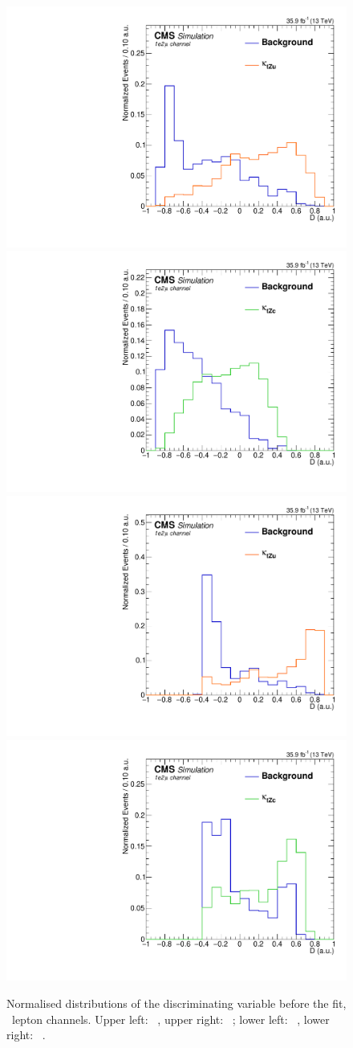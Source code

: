 \begin{figure}[htbp]
	\centering
	\includegraphics[width=0.49\linewidth]{6_Search/Figures/BDTdistributionsNorm/toppair_Zut_BDT_uue_Normalized}
	\includegraphics[width=0.49\linewidth]{6_Search/Figures/BDTdistributionsNorm/toppair_Zct_BDT_uue_Normalized}
	\includegraphics[width=0.49\linewidth]{6_Search/Figures/BDTdistributionsNorm/singletop_Zut_BDT_uue_Normalized}
	\includegraphics[width=0.49\linewidth]{6_Search/Figures/BDTdistributionsNorm/singletop_Zct_BDT_uue_Normalized}
	\caption{Normalised distributions of the discriminating variable before the fit, \emumu\ lepton channels. Upper left: \TTSR\ \Zut , upper right: \TTSR\ \Zct ; lower left: \STSR\  \Zut , lower right: \STSR\  \Zct .}
	\label{fig:bdtuuenorm}
\end{figure}	

